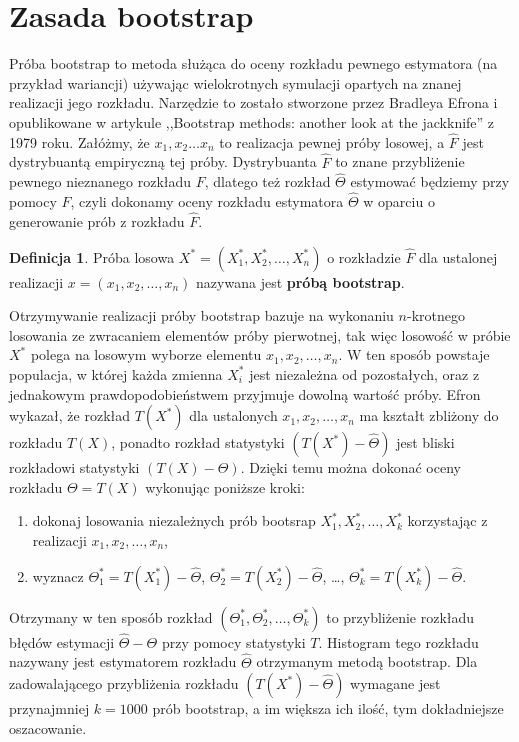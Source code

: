 \documentclass[inzynierska]{pwr_wmat_praca_dyplomowa}
\theoremstyle{plain}
\numberwithin{theorem}{chapter}
\theoremstyle{definition}
\numberwithin{theorem}{chapter}
\newtheorem{definition}[theorem]{Definicja}
\begin{document}
\section{Zasada bootstrap}
Próba bootstrap to metoda służąca do oceny rozkładu pewnego estymatora (na przykład wariancji)  używając wielokrotnych symulacji opartych na znanej realizacji jego rozkładu.  
 Narzędzie to zostało stworzone przez Bradleya Efrona i opublikowane w artykule ,,Bootstrap methods: another look at the jackknife'' z 1979 roku. Załóżmy, że $x_1, x_2 \dots x_n$ to realizacja pewnej próby losowej, a $\hat{F}$ jest dystrybuantą empiryczną tej próby. Dystrybuanta $\hat{F}$ to znane przybliżenie pewnego nieznanego rozkładu $F$, dlatego też rozkład $\hat{\Theta}$ estymować będziemy przy pomocy $\hat{F}$, czyli dokonamy oceny rozkładu estymatora $\hat{\Theta}$ w oparciu o generowanie prób z rozkładu $\hat{F}$. 
\begin{definition}
	Próba losowa $X^* = (X_1^*, X_2^*, \dots, X_n^*)$ o rozkładzie $\hat{F}$ dla ustalonej realizacji $x = (x_1, x_2, \dots, x_n)$ nazywana jest \textbf{próbą bootstrap}.
\end{definition}
Otrzymywanie realizacji próby bootstrap bazuje na wykonaniu $n$-krotnego losowania ze zwracaniem elementów próby pierwotnej, tak więc losowość w próbie $X^*$ polega na losowym wyborze elementu $x_1, x_2, \dots, x_n$. W ten sposób powstaje populacja, w której każda zmienna $X_i^*$ jest niezależna od pozostałych, oraz z jednakowym prawdopodobieństwem  przyjmuje dowolną wartość próby. Efron wykazał, że rozkład $T(X^*)$ dla ustalonych $x_1, x_2, \dots, x_n$ ma kształt zbliżony do rozkładu $T(X)$, ponadto rozkład statystyki $(T(X^*)-\hat{\Theta})$ jest bliski rozkładowi statystyki $(T(X)-\Theta)$. Dzięki temu można dokonać oceny rozkładu $\Theta=T(X)$ wykonując poniższe kroki:
\begin{enumerate}
	\item dokonaj losowania niezależnych prób bootsrap $X_1^*, X_2^*, \dots, X_k^*$ korzystając z realizacji $x_1, x_2, \dots, x_n$,
	\item wyznacz $\Theta_1^*=T(X_1^*)-\hat{\Theta}$, $\Theta_2^*=T(X_2^*)-\hat{\Theta}$, \dots, $\Theta_k^*=T(X_k^*)-\hat{\Theta}$.
\end{enumerate}
Otrzymany w ten sposób rozkład $(\Theta_1^*, \Theta_2^*, \dots, \Theta_k^*)$ to przybliżenie rozkładu błędów estymacji $\hat{\Theta}-\Theta$ przy pomocy statystyki $T$. Histogram tego rozkładu nazywany jest estymatorem rozkładu $\hat{\Theta}$ otrzymanym metodą bootstrap. Dla zadowalającego przybliżenia rozkładu $(T(X^*)-\hat{\Theta})$ wymagane jest przynajmniej $k=1000$ prób bootstrap, a im większa ich ilość, tym dokładniejsze oszacowanie.  
\end{document}
